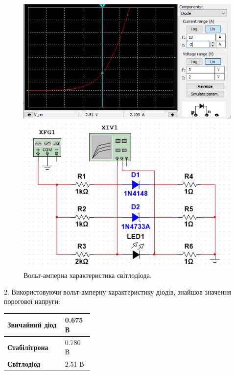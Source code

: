 \documentclass{article}
\begin{document}
\begin{normalsize}
	\begin{figure}[H]
		\begin{minipage}[t]{0.55\textwidth}
			\centering
			\includegraphics[width=\textwidth]{31}
		\end{minipage}
		\hfill
		\begin{minipage}[t]{0.35\textwidth}
			\centering
			\includegraphics[width=\textwidth]{32}
		\end{minipage}
		\caption{Вольт-амперна характеристика світлодіода.}
	\end{figure}
	
	2. Використовуючи вольт-амперну характеристику діодів, знайшов значення порогової напруги:
	
	\begin{table}[H]
		\centering
		\renewcommand*\arraystretch{1.3}
		\begin{tabular}{|p{0.25\linewidth}|p{0.1\linewidth}|}
			\hline
			\textbf{Звичайний діод} & 0.675 В\\
			\hline
			\textbf{Стабілітрона} & 0.780 В\\
			\hline
			\textbf{Світлодіод} & 2.51 В\\
			\hline
		\end{tabular}
	\end{table}
	

\end{normalsize}
\end{document}

